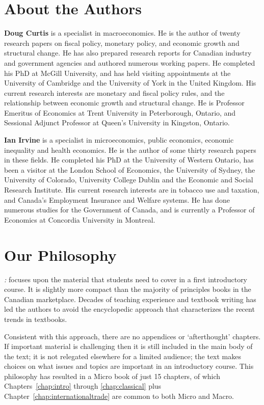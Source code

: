 \section*{About the Authors}

\textbf{Doug Curtis} is a specialist in macroeconomics. He is the author of twenty research papers on fiscal policy, monetary policy, and economic growth and structural change. He has also prepared research reports for Canadian industry and government agencies and authored numerous working papers. He completed his PhD at McGill University, and has held visiting appointments at the University of Cambridge and the University of York in the United Kingdom. His current research interests are monetary and fiscal policy rules, and the relationship between economic growth and structural change. He is Professor Emeritus of Economics at Trent University in Peterborough, Ontario, and Sessional Adjunct Professor at Queen's University in Kingston, Ontario.

\textbf{Ian Irvine} is a specialist in microeconomics, public economics, economic inequality and health economics. He is the author of some thirty research papers in these fields. He completed his PhD at the University of Western Ontario, has been a visitor at the London School of Economics, the University of Sydney, the University of Colorado, University College Dublin and the Economic and Social Research Institute. His current research interests are in tobacco use and taxation, and Canada's Employment Insurance and Welfare systems. He has done numerous studies for the Government of Canada, and is currently a Professor of Economics at Concordia University in Montreal.


\section*{Our Philosophy}

\emph{\booktitle: \booksubtitle} focuses upon the material that students need to cover in a first introductory course. It is slightly more compact than the majority of principles books in the Canadian marketplace. Decades of teaching experience and textbook writing has led the authors to avoid the encyclopedic approach that characterizes the recent trends in textbooks.

Consistent with this approach, there are no appendices or `afterthought' chapters. If important material is challenging then it is still included in the main body of the text; it is not relegated elsewhere for a limited audience; the text makes choices on what issues and topics are important in an introductory course. This philosophy has resulted in a Micro book of just 15 chapters, of which Chapters~\ref{chap:intro} through \ref{chap:classical} plus Chapter~\ref{chap:internationaltrade} are common to both Micro and Macro.


